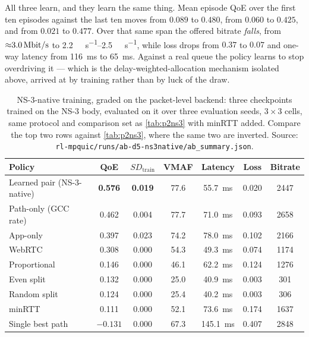 All three learn, and they learn the same thing. Mean episode QoE over the first ten episodes against the
last ten moves from $0.089$ to $0.480$, from $0.060$ to $0.425$, and from $0.021$ to $0.477$. Over that
same span the offered bitrate \emph{falls}, from ${\approx}\SI{3.0}{\mega\bit\per\second}$ to
\SIrange{2.2}{2.5}{\mega\bit\per\second}, while loss drops from $0.37$ to $0.07$ and one-way latency from
\SI{116}{\milli\second} to \SI{65}{\milli\second}. Against a real queue the policy learns to stop overdriving it --- which is
the delay-weighted-allocation mechanism isolated above, arrived at by training rather than by luck of
the draw.

\begin{table}[t]
  \centering
  \caption[NS-3-native training, graded on the packet-level backend]{NS-3-native training, graded on the packet-level backend: three checkpoints trained on the
  NS-3 body, evaluated on it over three evaluation seeds, $3 \times 3$ cells, same protocol and
  comparison set as \cref{tab:p2ns3} with minRTT added. Compare the top two rows against
  \cref{tab:p2ns3}, where the same two are inverted. Source:
  \texttt{rl-mpquic/runs/ab-d5-ns3native/ab\_summary.json}.}
  \label{tab:p2ns3native}
  \begin{tabular}{lcccccc}
    \toprule
    Policy & QoE & $\mathit{SD}_{\mathrm{train}}$ & VMAF & Latency & Loss & Bitrate \\
    \midrule
    Learned pair (NS-3-native) & \textbf{0.576} & \textbf{0.019} & 77.6 & \SI{55.7}{\milli\second}  & 0.020 & 2447 \\
    Path-only (GCC rate)       & 0.462 & 0.004 & 77.7 & \SI{71.0}{\milli\second}  & 0.093 & 2658 \\
    App-only                   & 0.397 & 0.023 & 74.2 & \SI{78.0}{\milli\second}  & 0.102 & 2166 \\
    WebRTC                     & 0.308 & 0.000 & 54.3 & \SI{49.3}{\milli\second}  & 0.074 & 1174 \\
    Proportional               & 0.146 & 0.000 & 46.1 & \SI{62.2}{\milli\second}  & 0.124 & 1276 \\
    Even split                 & 0.132 & 0.000 & 25.0 & \SI{40.9}{\milli\second}  & 0.003 & 301 \\
    Random split               & 0.124 & 0.000 & 25.4 & \SI{40.2}{\milli\second}  & 0.003 & 306 \\
    minRTT                     & 0.111 & 0.000 & 52.1 & \SI{73.6}{\milli\second}  & 0.174 & 1637 \\
    Single best path           & $-0.131$ & 0.000 & 67.3 & \SI{145.1}{\milli\second} & 0.407 & 2848 \\
    \bottomrule
  \end{tabular}
\end{table}

